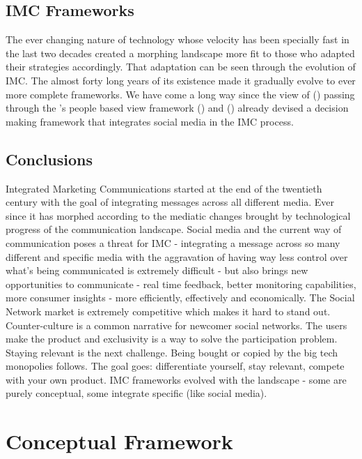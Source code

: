 \documentclass[12pt]{article}
\begin{document}
 \subsection{IMC Frameworks}\label{fw}
 
The ever changing nature of technology whose velocity has been specially fast in the last two decades created a morphing landscape more fit to those who adapted their strategies accordingly.  That adaptation can be seen through the evolution of IMC. The almost forty long years of its existence made it gradually evolve to ever more complete frameworks. We have come a long way since the view of \citeauthor{nowak} (\citeyear{nowak}) passing through the \citeauthor{kliatchko}'s people based view framework (\citeyear{kliatchko}) and \citeauthor{valos}  (\citeyear{valos}) already devised a decision making framework that integrates social media in the IMC process. 
 
  \subsection{Conclusions}\label{conclusions}
  
  Integrated Marketing Communications started at the end of the twentieth century with the goal of integrating messages across all different media. Ever since it has morphed according to the mediatic changes brought by technological progress of the communication landscape. Social media and the current way of communication poses a threat for IMC - integrating a message across so many different and specific media with the aggravation of having way less control over what’s being communicated is extremely difficult - but also brings new opportunities to communicate - real time feedback, better monitoring capabilities, more consumer insights - more efficiently, effectively and economically. The Social Network market is extremely competitive which makes it hard to stand out. Counter-culture is a common narrative for newcomer social networks. The users make the product and exclusivity is a way to solve the participation problem. Staying relevant is the next challenge. Being bought or copied by the big tech monopolies follows. The goal goes: differentiate yourself, stay relevant, compete with your own product. IMC frameworks evolved with the landscape - some are purely conceptual, some integrate specific (like social media). 
 


\section{Conceptual Framework}
\end{document}
